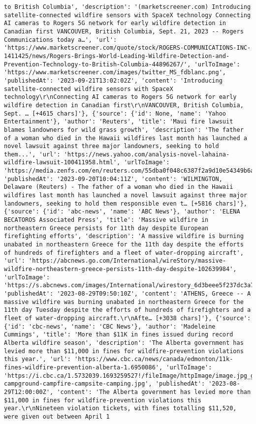 \documentclass[
  letterpaper,
  DIV=11,
  numbers=noendperiod]{scrartcl}
\begin{document}
\begin{verbatim}
to British Columbia', 'description': '(marketscreener.com) Introducing satellite-connected wildfire sensors with SpaceX technology Connecting AI cameras to Rogers 5G network for early wildfire detection in Canadian first VANCOUVER, British Columbia, Sept. 21, 2023 -- Rogers Communications today a…', 'url': 'https://www.marketscreener.com/quote/stock/ROGERS-COMMUNICATIONS-INC-1411425/news/Rogers-Brings-World-Leading-Wildfire-Detection-and-Prevention-Technology-to-British-Columbia-44896267/', 'urlToImage': 'https://www.marketscreener.com/images/twitter_MS_fdblanc.png', 'publishedAt': '2023-09-21T13:02:02Z', 'content': 'Introducing satellite-connected wildfire sensors with SpaceX technology\r\nConnecting AI cameras to Rogers 5G network for early wildfire detection in Canadian first\r\nVANCOUVER, British Columbia, Sept. … [+4615 chars]'}, {'source': {'id': None, 'name': 'Yahoo Entertainment'}, 'author': 'Reuters', 'title': 'Maui fire lawsuit blames landowners for wild grass growth', 'description': 'The father of a woman who died in the Hawaii wildfires last month has launched a novel lawsuit against three major landowners, seeking to hold them...', 'url': 'https://news.yahoo.com/analysis-novel-lahaina-wildfire-lawsuit-100411958.html', 'urlToImage': 'https://media.zenfs.com/en/reuters.com/55dba0f048c6387f2a9d10e54349b6a3', 'publishedAt': '2023-09-20T10:04:11Z', 'content': 'WILMINGTON, Delaware (Reuters) - The father of a woman who died in the Hawaii wildfires last month has launched a novel lawsuit against three major landowners, seeking to hold them responsible even t… [+5816 chars]'}, {'source': {'id': 'abc-news', 'name': 'ABC News'}, 'author': 'ELENA BECATOROS Associated Press', 'title': 'Massive wildfire in northeastern Greece persists for 11th day despite European firefighting efforts', 'description': 'A massive wildfire is burning unabated in northeastern Greece for the 11th day despite the efforts of hundreds of firefighters and a fleet of water-dropping aircraft', 'url': 'https://abcnews.go.com/International/wireStory/massive-wildfire-northeastern-greece-persists-11th-day-despite-102639984', 'urlToImage': 'https://s.abcnews.com/images/International/wirestory_6d3beee5f237dc3a71cdf3acb7444955_12x5_992.jpg', 'publishedAt': '2023-08-29T09:50:10Z', 'content': 'ATHENS, Greece -- A massive wildfire was burning unabated in northeastern Greece for the 11th day Tuesday despite the efforts of hundreds of firefighters and a fleet of water-dropping aircraft.\r\nAfte… [+3038 chars]'}, {'source': {'id': 'cbc-news', 'name': 'CBC News'}, 'author': 'Madeleine Cummings', 'title': 'More than $11K in fines issued during record Alberta wildfire season', 'description': 'The Alberta government has levied more than $11,000 in fines for wildfire-prevention violations this year.', 'url': 'https://www.cbc.ca/news/canada/edmonton/11k-fines-wildfire-prevention-alberta-1.6950086', 'urlToImage': 'https://i.cbc.ca/1.5732039.1693259527!/fileImage/httpImage/image.jpg_gen/derivatives/16x9_620/alberta-campground-campfire-campsite-camping.jpg', 'publishedAt': '2023-08-29T12:00:00Z', 'content': 'The Alberta government has levied more than $11,000 in fines for wildfire-prevention violations this year.\r\nNineteen violation tickets, with fines totalling $11,520, were given out between April 1 
\end{verbatim}
\end{document}
